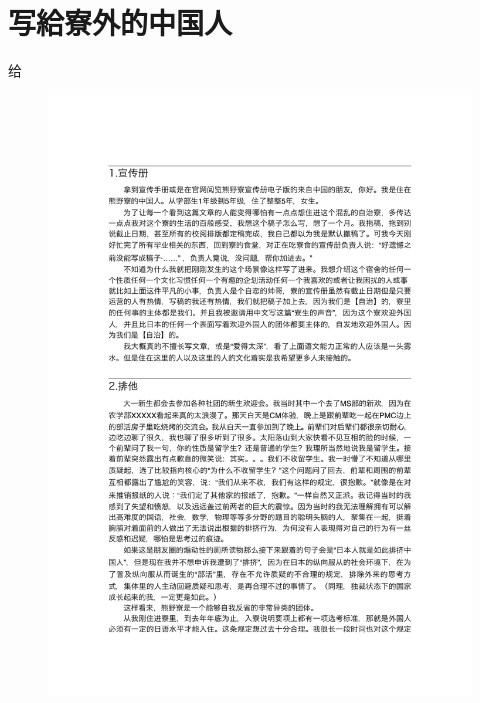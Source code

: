 \documentclass[10pt,b5jsbook,dvips,dvipdfmx,openany]{jsbook}
\theoremstyle{definition}
\begin{document}

\newpage

  \section{写給寮外的中国人}
\foreignlanguage{schinese}{给}
\begin{figure}[h]
		\begin{center}
 	 	\includegraphics[scale=0.85]{voice.pdf}
  \end{center}
		\end{figure}
\end{document}
